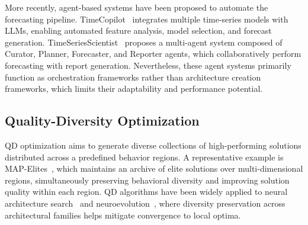 More recently, agent-based systems have been proposed to automate the forecasting pipeline. TimeCopilot~\cite{TimeCopilot} integrates multiple time-series models with LLMs, enabling automated feature analysis, model selection, and forecast generation. TimeSeriesScientist~\cite{TimeSeriesScientist} proposes a multi-agent system composed of Curator, Planner, Forecaster, and Reporter agents, which collaboratively perform forecasting with report generation. Nevertheless, these agent systems primarily function as orchestration frameworks rather than architecture creation frameworks, which limits their adaptability and performance potential.

\subsection{Quality-Diversity Optimization}

QD optimization aims to generate diverse collections of high-performing solutions distributed across a predefined behavior regions. A representative example is MAP-Elites~\cite{MAP_Elites}, which maintains an archive of elite solutions over multi-dimensional regions, simultaneously preserving behavioral diversity and improving solution quality within each region. QD algorithms have been widely applied to neural architecture search~\cite{neural_architecture_search} and neuroevolution~\cite{neuroevolution}, where diversity preservation across architectural families helps mitigate convergence to local optima.